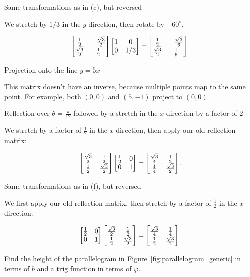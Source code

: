 \documentclass[../gatm_answers.tex]{subfiles}
\begin{document}
\begin{inner_problem}
\item Same transformations as in (c), but reversed
\end{inner_problem}

We stretch by $1/3$ in the $y$ direction, then rotate by $-60^\circ$.

$$\begin{bmatrix} \frac{1}{2} & -\frac{\sqrt{3}}{2} \\ \frac{\sqrt{3}}{2} & \frac{1}{2} \end{bmatrix}\begin{bmatrix} 1 & 0 \\ 0 & 1/3 \end{bmatrix} = \begin{bmatrix} \frac{1}{2} & -\frac{\sqrt{3}}{6} \\ \frac{\sqrt{3}}{2} & \frac{1}{6} \end{bmatrix}.$$

\begin{inner_problem}
\item Projection onto the line $y=5x$
\end{inner_problem}

This matrix doesn't have an inverse, because multiple points map to the same point. For example, both $(0,0)$ and $(5,-1)$ project to $(0,0)$

\begin{inner_problem}
\item Reflection over $\theta=\frac{\pi}{12}$ followed by a stretch in the $x$ direction by a factor of $2$
\end{inner_problem}

We stretch by a factor of $\frac{1}{2}$ in the $x$ direction, then apply our old reflection matrix:

$$\begin{bmatrix} \frac{\sqrt{3}}{2} & \frac{1}{2} \\ \frac{1}{2} & \frac{\sqrt{3}}{2} \end{bmatrix}\begin{bmatrix} \frac{1}{2} & 0 \\ 0 & 1 \end{bmatrix} = \begin{bmatrix} \frac{\sqrt{3}}{4} & \frac{1}{2} \\ \frac{1}{4} & \frac{\sqrt{3}}{2} \end{bmatrix}.$$

\begin{inner_problem}
\item Same transformations as in (f), but reversed \label{prob:matrix_prod_end}
\end{inner_problem}

We first apply our old reflection matrix, then stretch by a factor of $\frac{1}{2}$ in the $x$ direction:

$$\begin{bmatrix} \frac{1}{2} & 0 \\ 0 & 1 \end{bmatrix}\begin{bmatrix} \frac{\sqrt{3}}{2} & \frac{1}{2} \\ \frac{1}{2} & \frac{\sqrt{3}}{2} \end{bmatrix} = \begin{bmatrix} \frac{\sqrt{3}}{4} & \frac{1}{4} \\ \frac{1}{2} & \frac{\sqrt{3}}{2} \end{bmatrix}.$$

\begin{outer_problem}
\item
\end{outer_problem}

\begin{inner_problem}[start=1]
\item Find the height of the parallelogram in Figure~\ref{fig:parallelogram_generic} in terms of $b$ and a trig function in terms of $\varphi$.
\end{inner_problem}
\end{document}

